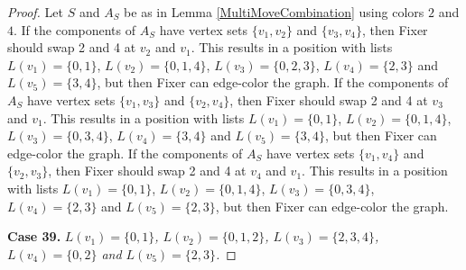 \documentclass[12pt]{amsart}
\theoremstyle{plain}
\theoremstyle{definition}
\theoremstyle{remark}
\begin{document}
\begin{proof}
Let $S$ and $A_S$ be as in Lemma \ref{MultiMoveCombination} using colors $2$ and $4$. If the components of $A_S$ have vertex sets $\{v_1, v_2\}$ and $\{v_3, v_4\}$, then Fixer should swap 2 and 4 at $v_2$ and $v_1$. This results in a position with lists $L(v_1) = \{0, 1\}$, $L(v_2) = \{0, 1, 4\}$, $L(v_3) = \{0, 2, 3\}$, $L(v_4) = \{2, 3\}$ and $L(v_5) = \{3, 4\}$, but then Fixer can edge-color the graph.
If the components of $A_S$ have vertex sets $\{v_1, v_3\}$ and $\{v_2, v_4\}$, then Fixer should swap 2 and 4 at $v_3$ and $v_1$. This results in a position with lists $L(v_1) = \{0, 1\}$, $L(v_2) = \{0, 1, 4\}$, $L(v_3) = \{0, 3, 4\}$, $L(v_4) = \{3, 4\}$ and $L(v_5) = \{3, 4\}$, but then Fixer can edge-color the graph.
If the components of $A_S$ have vertex sets $\{v_1, v_4\}$ and $\{v_2, v_3\}$, then Fixer should swap 2 and 4 at $v_4$ and $v_1$. This results in a position with lists $L(v_1) = \{0, 1\}$, $L(v_2) = \{0, 1, 4\}$, $L(v_3) = \{0, 3, 4\}$, $L(v_4) = \{2, 3\}$ and $L(v_5) = \{2, 3\}$, but then Fixer can edge-color the graph.

\noindent\textbf{Case 39.  }\textit{$L(v_1) = \{0, 1\}$, $L(v_2) = \{0, 1, 2\}$, $L(v_3) = \{2, 3, 4\}$, $L(v_4) = \{0, 2\}$ and $L(v_5) = \{2, 3\}$.}


\end{proof}
\end{document}
